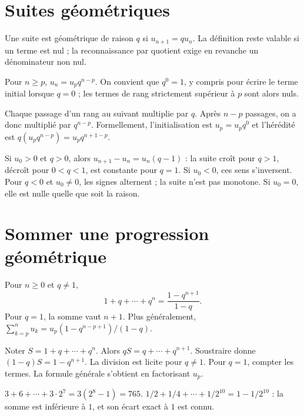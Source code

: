 \documentclass[../cours_1re.tex]{subfiles}
\begin{document}
\section{Suites géométriques}
\begin{definition}
Une suite est géométrique de raison $q$ si $u_{n+1}=qu_n$. La définition reste valable si un terme est nul ; la reconnaissance par quotient exige en revanche un dénominateur non nul.
\end{definition}
\begin{theoreme}
Pour $n\ge p$, $u_n=u_pq^{n-p}$. On convient que $q^0=1$, y compris pour écrire le terme initial lorsque $q=0$ ; les termes de rang strictement supérieur à $p$ sont alors nuls.
\end{theoreme}
\begin{demonstration}
Chaque passage d'un rang au suivant multiplie par $q$. Après $n-p$ passages, on a donc multiplié par $q^{n-p}$. Formellement, l'initialisation est $u_p=u_pq^0$ et l'hérédité est $q(u_pq^{n-p})=u_pq^{n+1-p}$.
\end{demonstration}
Si $u_0>0$ et $q>0$, alors $u_{n+1}-u_n=u_n(q-1)$ : la suite croît pour $q>1$, décroît pour $0<q<1$, est constante pour $q=1$. Si $u_0<0$, ces sens s'inversent. Pour $q<0$ et $u_0\ne0$, les signes alternent ; la suite n'est pas monotone. Si $u_0=0$, elle est nulle quelle que soit la raison.
\section{Sommer une progression géométrique}
\begin{theoreme}
Pour $n\ge0$ et $q\ne1$,
\[
1+q+\cdots+q^n=\frac{1-q^{n+1}}{1-q}.
\]
Pour $q=1$, la somme vaut $n+1$. Plus généralement,
$\sum_{k=p}^{n}u_k=u_p(1-q^{n-p+1})/(1-q)$.
\end{theoreme}
\begin{demonstration}
Noter $S=1+q+\cdots+q^n$. Alors $qS=q+\cdots+q^{n+1}$.
Soustraire donne $(1-q)S=1-q^{n+1}$. La division est licite pour $q\ne1$. Pour $q=1$, compter les termes. La formule générale s'obtient en factorisant $u_p$.
\end{demonstration}
\begin{exemple}
$3+6+\cdots+3\cdot2^7=3(2^8-1)=765$.
$1/2+1/4+\cdots+1/2^{10}=1-1/2^{10}$ : la somme est inférieure à $1$, et son écart exact à $1$ est connu.
\end{exemple}
\end{document}
